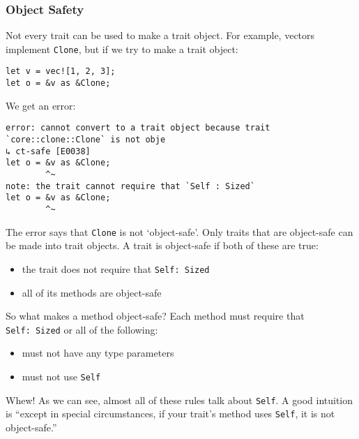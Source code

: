 \documentclass[a4paper,]{book}
\providecommand{\tightlist}{%
  \setlength{\itemsep}{0pt}\setlength{\parskip}{0pt}}
\begin{document}
\subsubsection{Object Safety}\label{object-safety}

Not every trait can be used to make a trait object. For example, vectors
implement \texttt{Clone}, but if we try to make a trait object:

\begin{verbatim}
let v = vec![1, 2, 3];
let o = &v as &Clone;
\end{verbatim}

We get an error:

\begin{verbatim}
error: cannot convert to a trait object because trait `core::clone::Clone` is not obje
↳ ct-safe [E0038]
let o = &v as &Clone;
        ^~
note: the trait cannot require that `Self : Sized`
let o = &v as &Clone;
        ^~
\end{verbatim}

The error says that \texttt{Clone} is not `object-safe'. Only traits
that are object-safe can be made into trait objects. A trait is
object-safe if both of these are true:

\begin{itemize}
\tightlist
\item
  the trait does not require that \texttt{Self:\ Sized}
\item
  all of its methods are object-safe
\end{itemize}

So what makes a method object-safe? Each method must require that
\texttt{Self:\ Sized} or all of the following:

\begin{itemize}
\tightlist
\item
  must not have any type parameters
\item
  must not use \texttt{Self}
\end{itemize}

Whew! As we can see, almost all of these rules talk about \texttt{Self}.
A good intuition is ``except in special circumstances, if your trait's
method uses \texttt{Self}, it is not object-safe.''

\end{document}
